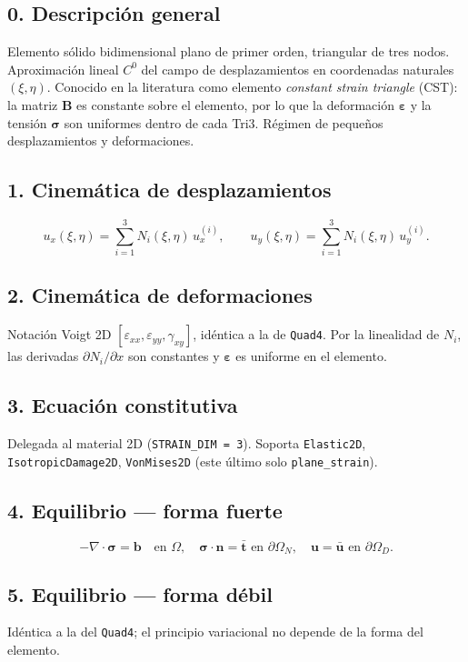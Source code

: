 \documentclass[11pt,letterpaper,oneside]{report}
\begin{document}
\subsection{0. Descripción general}
Elemento sólido bidimensional plano de primer orden, triangular de tres nodos. Aproximación lineal $C^0$ del campo de desplazamientos en coordenadas naturales $(\xi, \eta)$. Conocido en la literatura como elemento \textit{constant strain triangle} (CST): la matriz $\mathbf{B}$ es constante sobre el elemento, por lo que la deformación $\boldsymbol{\varepsilon}$ y la tensión $\boldsymbol{\sigma}$ son uniformes dentro de cada Tri3. Régimen de pequeños desplazamientos y deformaciones.

\subsection{1. Cinemática de desplazamientos}
\[
u_x(\xi, \eta) = \sum_{i=1}^{3} N_i(\xi, \eta)\, u_x^{(i)}, \qquad u_y(\xi, \eta) = \sum_{i=1}^{3} N_i(\xi, \eta)\, u_y^{(i)}.
\]

\subsection{2. Cinemática de deformaciones}
Notación Voigt 2D $[\varepsilon_{xx}, \varepsilon_{yy}, \gamma_{xy}]$, idéntica a la de \texttt{Quad4}. Por la linealidad de $N_i$, las derivadas $\partial N_i / \partial x$ son constantes y $\boldsymbol{\varepsilon}$ es uniforme en el elemento.

\subsection{3. Ecuación constitutiva}
Delegada al material 2D (\texttt{STRAIN\_DIM = 3}). Soporta \texttt{Elastic2D}, \texttt{IsotropicDamage2D}, \texttt{VonMises2D} (este último solo \texttt{plane\_strain}).

\subsection{4. Equilibrio --- forma fuerte}
\[
-\nabla \cdot \boldsymbol{\sigma} = \mathbf{b} \quad \text{en } \Omega, \quad \boldsymbol{\sigma} \cdot \mathbf{n} = \bar{\mathbf{t}} \text{ en } \partial\Omega_N, \quad \mathbf{u} = \bar{\mathbf{u}} \text{ en } \partial\Omega_D.
\]

\subsection{5. Equilibrio --- forma débil}
Idéntica a la del \texttt{Quad4}; el principio variacional no depende de la forma del elemento.
\end{document}
